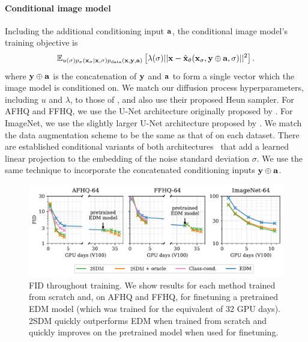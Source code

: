 \paragraph{Conditional image model}
Including the additional conditioning input ${\mathbf{a}}$, the conditional image model's training objective is
\begin{equation}
\label{eq:conditional-image-model-objective}
    \mathbb{E}_{u(\sigma)p_\sigma({\mathbf{x}}_\sigma|{\mathbf{x}},\sigma)p_{\rm{data}}({\mathbf{x}},{\mathbf{y}},{\mathbf{a}})} \left[ \lambda(\sigma) \lvert\lvert {\mathbf{x}} - \hat{{\mathbf{x}}}_\theta({\mathbf{x}}_\sigma, {\mathbf{y}} \oplus {\mathbf{a}}, \sigma) \rvert\rvert^2 \right].
\end{equation}
where ${\mathbf{y}} \oplus {\mathbf{a}}$ is the concatenation of ${\mathbf{y}}$ and ${\mathbf{a}}$ to form a single vector which the image model is conditioned on. We match our diffusion process hyperparameters, including $u$ and $\lambda$, to those of \citet{karras2022elucidating}, and also use their proposed Heun sampler.  For AFHQ and FFHQ, we use the U-Net architecture originally proposed by \citet{song2020score}. For ImageNet, we use the slightly larger U-Net architecture proposed by \citet{dhariwal2021diffusion}. We match the data augmentation scheme to be the same as that of \citet{karras2022elucidating} on each dataset. There are established conditional variants of both architectures~\citep{dhariwal2021diffusion,karras2022elucidating} that add a learned linear projection to the embedding of the noise standard deviation $\sigma$.  We use the same technique to incorporate the concatenated conditioning inputs ${\mathbf{y}}\oplus{\mathbf{a}}$.

\begin{figure}[t]
    \centering
    \includegraphics[width=\textwidth]{figs/2sdm/cond-results-1.pdf}
    \caption{FID throughout training. We show results for each method trained from scratch and, on AFHQ and FFHQ, for finetuning a pretrained EDM model (which was trained for the equivalent of 32 GPU days). 2SDM quickly outperforms EDM when trained from scratch and quickly improves on the pretrained model when used for finetuning.}
    \label{fig:fid_vs_training}
\end{figure}

